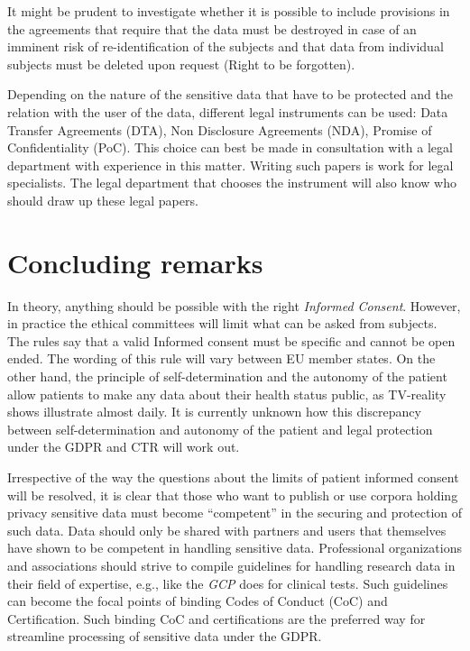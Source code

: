 \documentclass[10pt, a4paper]{article}
\begin{document}
It might be prudent to investigate whether it is possible to include provisions in the agreements that require that the data must be destroyed in case of an imminent risk of re-identification of the subjects and that data from individual subjects must be deleted upon request (Right to be forgotten).

Depending on the nature of the sensitive data that have to be protected and the relation with the user of the data, different legal instruments can be used: Data Transfer Agreements (DTA), Non Disclosure Agreements (NDA), Promise of Confidentiality (PoC). This choice can best be made in consultation with a legal department with experience in this matter. Writing such papers is work for legal specialists. The legal department that chooses the instrument will also know who should draw up these legal papers. 

\section{Concluding remarks}\label{Conclusions}

In theory, anything should be possible with the right {\em Informed Consent}. However, in practice the ethical committees will limit what can be asked from subjects. The rules say that a valid Informed consent must be specific and cannot be open ended. The wording of this rule will vary between EU member states. On the other hand, the principle of self-determination and the autonomy of the patient allow patients to make any data about their health status public, as TV-reality shows illustrate almost daily. It is currently unknown how this discrepancy between self-determination and autonomy of the patient and legal protection under the GDPR and CTR will work out.

Irrespective of the way the questions about the limits of patient informed consent will be resolved, it is clear that those who want to publish or use corpora holding privacy sensitive data must become ``competent'' in the securing and protection of such data. Data should only be shared with partners and users that themselves have shown to be competent in handling sensitive data. Professional organizations and associations should strive to compile guidelines for handling research data in their field of expertise, e.g., like the {\em GCP} does for clinical tests. Such guidelines can become the focal points of binding Codes of Conduct (CoC) and Certification. Such binding CoC and certifications are the preferred way for streamline processing of sensitive data under the GDPR. 
\end{document}
